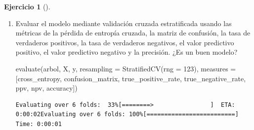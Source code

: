 \documentclass[
  a4paper,
]{scrreport}
\newenvironment{Shaded}{\begin{snugshade}}{\end{snugshade}}
\newcommand{\FloatTok}[1]{\textcolor[rgb]{0.68,0.00,0.00}{#1}}
\newcommand{\FunctionTok}[1]{\textcolor[rgb]{0.28,0.35,0.67}{#1}}
\newcommand{\NormalTok}[1]{\textcolor[rgb]{0.00,0.23,0.31}{#1}}
\newcommand{\OperatorTok}[1]{\textcolor[rgb]{0.37,0.37,0.37}{#1}}
\theoremstyle{definition}
\newtheorem{exercise}{Ejercicio}[chapter]
\theoremstyle{remark}
\begin{document}
\begin{exercise}[]
\begin{enumerate}
\begin{tcolorbox}
  \end{tcolorbox}
\item
  Evaluar el modelo mediante validación cruzada estratificada usando las
  métricas de la pérdida de entropía cruzada, la matriz de confusión, la
  tasa de verdaderos positivos, la tasa de verdaderos negativos, el
  valor predictivo positivo, el valor predictivo negativo y la
  precisión. ¿Es un buen modelo?

  \begin{tcolorbox}[enhanced jigsaw, toptitle=1mm, breakable, toprule=.15mm, opacitybacktitle=0.6, coltitle=black, titlerule=0mm, arc=.35mm, title=\textcolor{quarto-callout-tip-color}{\faLightbulb}\hspace{0.5em}{Solución}, rightrule=.15mm, opacityback=0, colback=white, bottomrule=.15mm, leftrule=.75mm, colbacktitle=quarto-callout-tip-color!10!white, bottomtitle=1mm, colframe=quarto-callout-tip-color-frame, left=2mm]

\begin{Shaded}
\begin{Highlighting}[]
\FunctionTok{evaluate}\NormalTok{(arbol, X, y, resampling }\OperatorTok{=} \FunctionTok{StratifiedCV}\NormalTok{(rng }\OperatorTok{=} \FloatTok{123}\NormalTok{), measures }\OperatorTok{=}\NormalTok{ [cross\_entropy, confusion\_matrix, true\_positive\_rate, true\_negative\_rate, ppv, npv, accuracy])}
\end{Highlighting}
\end{Shaded}

\begin{verbatim}
Evaluating over 6 folds:  33%[========>                ]  ETA: 0:00:02Evaluating over 6 folds: 100%[=========================] Time: 0:00:01
\end{verbatim}


\end{tcolorbox}
\end{enumerate}
\end{exercise}
\end{document}
